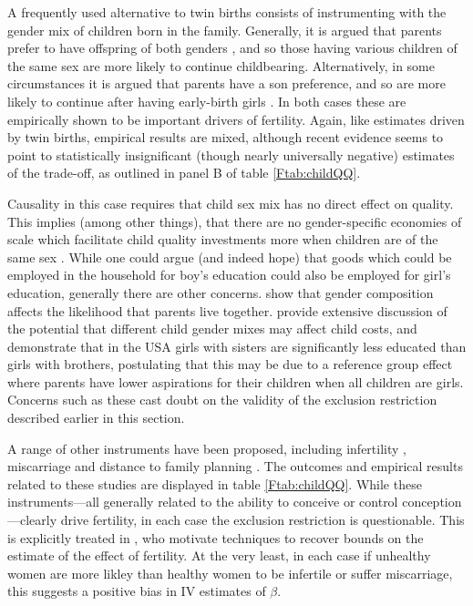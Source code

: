A frequently used alternative to twin births consists of instrumenting with the 
gender mix of children born in the family. Generally, it is argued that parents
prefer to have offspring of both genders \citep{ConleyGlauber2006,Angristetal2010,
Beckeretal2010,MillimetWang2011,FitzsimonsMalde2014}, and so those having various 
children of the same sex are more likely to continue childbearing. Alternatively, 
in some circumstances it is argued that parents have a son preference, and so are 
more likely to continue after having early-birth girls \citep{Lee2008,
KumarKugler2011}. In both cases these are empirically shown to be important 
drivers of fertility.  Again, like estimates driven by twin births, empirical 
results are mixed, although recent evidence seems to point to statistically 
insignificant (though nearly universally negative) estimates of the trade-off, 
as outlined in panel B of table \ref{Ftab:childQQ}.

Causality in this case requires that child sex mix has no direct effect on 
quality.  This implies (among other things), that there are no gender-specific 
economies of scale which facilitate child quality investments more when children
are of the same sex \citep{ButcherCase1994}.  While one could argue (and indeed
hope) that goods which could be employed in the household for boy's education 
could also be employed for girl's education, generally there are other concerns.
\citet{DahlMoretti2008} show that gender composition affects the likelihood that
parents live together. \citet{ButcherCase1994} provide extensive discussion of 
the potential that different child gender mixes may affect child costs, and 
demonstrate that in the USA girls with sisters are significantly less educated 
than girls with brothers, postulating that this may be due to a reference group 
effect where parents have lower aspirations for their children when all children 
are girls. Concerns such as these cast doubt on the validity of the exclusion 
restriction described earlier in this section.

A range of other instruments have been proposed, including infertility
\citep{Bougmaetal2015}, miscarriage \citep{Hotzetal1997,Marlani2008,Miller2009}
and distance to family planning \citep{DangRogers2013}. The outcomes and 
empirical results related to these studies are displayed in table 
\ref{Ftab:childQQ}.  While these instruments---all generally related to the 
ability to conceive or control conception---clearly drive fertility, in each 
case the exclusion restriction is questionable.  This is explicitly treated in
\citet{Hotzetal1997}, who motivate techniques to recover bounds on the estimate
of the effect of fertility.  At the very least, in each case if unhealthy
women are more likley than healthy women to be infertile or suffer miscarriage,
this suggests a positive bias in IV estimates of $\beta$.

